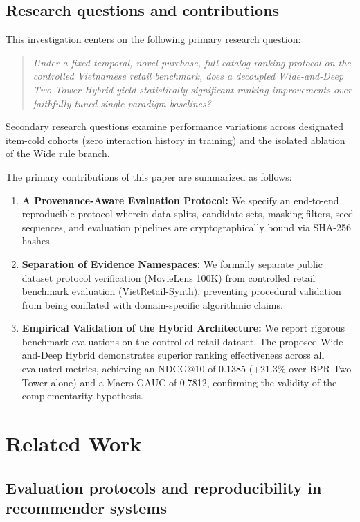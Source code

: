 \documentclass[10pt,a4paper]{article}
\begin{document}
\subsection{Research questions and contributions}

This investigation centers on the following primary research question:
\begin{quote}
\textit{Under a fixed temporal, novel-purchase, full-catalog ranking protocol on the controlled Vietnamese retail benchmark, does a decoupled Wide-and-Deep Two-Tower Hybrid yield statistically significant ranking improvements over faithfully tuned single-paradigm baselines?}
\end{quote}
Secondary research questions examine performance variations across designated item-cold cohorts (zero interaction history in training) and the isolated ablation of the Wide rule branch.

The primary contributions of this paper are summarized as follows:
\begin{enumerate}
    \item \textbf{A Provenance-Aware Evaluation Protocol:} We specify an end-to-end reproducible protocol wherein data splits, candidate sets, masking filters, seed sequences, and evaluation pipelines are cryptographically bound via SHA-256 hashes.
    \item \textbf{Separation of Evidence Namespaces:} We formally separate public dataset protocol verification (MovieLens 100K) from controlled retail benchmark evaluation (VietRetail-Synth), preventing procedural validation from being conflated with domain-specific algorithmic claims.
    \item \textbf{Empirical Validation of the Hybrid Architecture:} We report rigorous benchmark evaluations on the controlled retail dataset. The proposed Wide-and-Deep Hybrid demonstrates superior ranking effectiveness across all evaluated metrics, achieving an NDCG@10 of 0.1385 (+21.3\% over BPR Two-Tower alone) and a Macro GAUC of 0.7812, confirming the validity of the complementarity hypothesis.
\end{enumerate}

\section{Related Work}

\subsection{Evaluation protocols and reproducibility in recommender systems}
\end{document}
